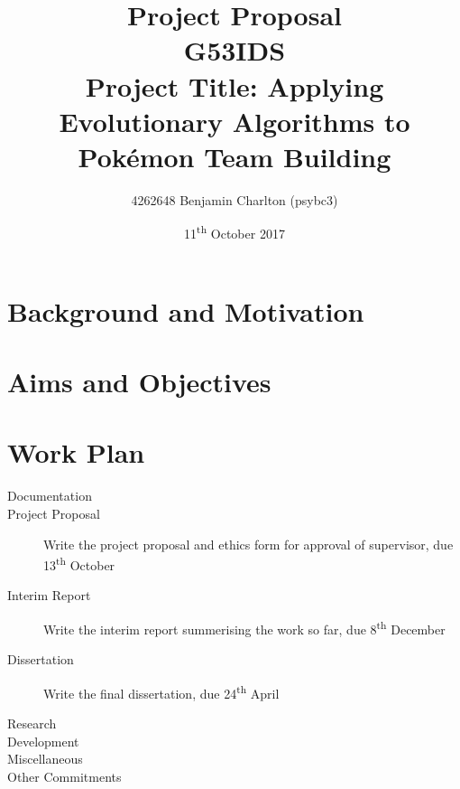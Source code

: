 \documentclass{article}
\newcommand{\Pokemon}{Pok\'{e}mon}
\begin{document}
\title{
    Project Proposal
    \\ \large{G53IDS}
    \\ \large{Project Title: Applying Evolutionary Algorithms to \Pokemon{} Team Building}\vspace{-3ex}}
\author{4262648 Benjamin Charlton (psybc3)}
\date{\vspace{-2ex}11\textsuperscript{th} October 2017}
\maketitle

\section{Background and Motivation}
\lipsum[1]

\section{Aims and Objectives}
\lipsum[1]

\section{Work Plan}
\lipsum[1]

\begin{description}
\item [Documentation]
\item [Project Proposal] Write the project proposal and ethics form for approval of supervisor, due 13\textsuperscript{th} October
\item [Interim Report] Write the interim report summerising the work so far, due 8\textsuperscript{th} December
\item [Dissertation] Write the final dissertation, due 24\textsuperscript{th} April

\item [Research]

\item [Development]

\item [Miscellaneous]

\item [Other Commitments] 
\end{description}

\nocite{bar}


\end{document}
